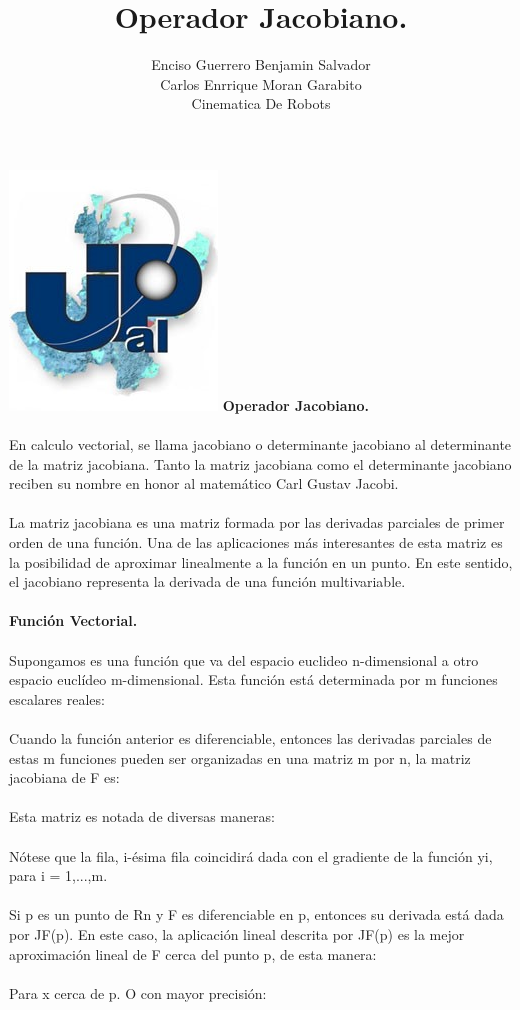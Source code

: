 \documentclass[12pt,a4paper]{article}
\author{Enciso Guerrero Benjamin Salvador\\
Carlos Enrrique Moran Garabito\\
Cinematica De Robots }
\title{Operador Jacobiano.}
\begin{document}
\maketitle
\includegraphics[scale=1.8]{upzmgg.jpg} 
\newpage
\textbf{Operador Jacobiano.}
\\\\
En calculo vectorial, se llama jacobiano o determinante jacobiano al determinante de la matriz jacobiana. Tanto la matriz jacobiana como el determinante jacobiano reciben su nombre en honor al matemático Carl Gustav Jacobi.
\\\\
La matriz jacobiana es una matriz formada por las derivadas parciales de primer orden de una función. Una de las aplicaciones más interesantes de esta matriz es la posibilidad de aproximar linealmente a la función en un punto. En este sentido, el jacobiano representa la derivada de una función multivariable.
\\\\
\textbf{Función Vectorial.}
\\\\
Supongamos   es una función que va del espacio euclideo n-dimensional a otro espacio euclídeo m-dimensional. Esta función está determinada por m funciones escalares reales:
\\\\
Cuando la función anterior es diferenciable, entonces las derivadas parciales de estas m funciones pueden ser organizadas en una matriz m por n, la matriz jacobiana de F es:
\\\\
Esta matriz es notada de diversas maneras:
\\\\
Nótese que la fila, i-ésima fila coincidirá dada con el gradiente de la función yi, para i = 1,...,m.
\\\\
Si p es un punto de Rn y F es diferenciable en p, entonces su derivada está dada por JF(p). En este caso, la aplicación lineal descrita por JF(p) es la mejor aproximación lineal de F cerca del punto p, de esta manera:
\\\\
Para x cerca de p. O con mayor precisión:
\\\\
\end{document}
